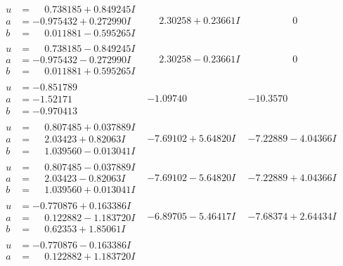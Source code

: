 \documentclass[1p]{elsarticle_modified}
\theoremstyle{definition}
\begin{document}
$$\begin{array}{c|c|c}
 \hline 
\begin{aligned}
u &= \phantom{-}0.738185 + 0.849245 I \\
a &= -0.975432 + 0.272990 I \\
b &= \phantom{-}0.011881 - 0.595265 I\end{aligned}
 & \phantom{-}2.30258 + 0.23661 I & \phantom{-0.000000 } 0 \\ \hline\begin{aligned}
u &= \phantom{-}0.738185 - 0.849245 I \\
a &= -0.975432 - 0.272990 I \\
b &= \phantom{-}0.011881 + 0.595265 I\end{aligned}
 & \phantom{-}2.30258 - 0.23661 I & \phantom{-0.000000 } 0 \\ \hline\begin{aligned}
u &= -0.851789\phantom{ +0.000000I} \\
a &= -1.52171\phantom{ +0.000000I} \\
b &= -0.970413\phantom{ +0.000000I}\end{aligned}
 & -1.09740\phantom{ +0.000000I} & -10.3570\phantom{ +0.000000I} \\ \hline\begin{aligned}
u &= \phantom{-}0.807485 + 0.037889 I \\
a &= \phantom{-}2.03423 + 0.82063 I \\
b &= \phantom{-}1.039560 - 0.013041 I\end{aligned}
 & -7.69102 + 5.64820 I & -7.22889 - 4.04366 I \\ \hline\begin{aligned}
u &= \phantom{-}0.807485 - 0.037889 I \\
a &= \phantom{-}2.03423 - 0.82063 I \\
b &= \phantom{-}1.039560 + 0.013041 I\end{aligned}
 & -7.69102 - 5.64820 I & -7.22889 + 4.04366 I \\ \hline\begin{aligned}
u &= -0.770876 + 0.163386 I \\
a &= \phantom{-}0.122882 - 1.183720 I \\
b &= \phantom{-}0.62353 + 1.85061 I\end{aligned}
 & -6.89705 - 5.46417 I & -7.68374 + 2.64434 I \\ \hline\begin{aligned}
u &= -0.770876 - 0.163386 I \\
a &= \phantom{-}0.122882 + 1.183720 I \\

\end{aligned}
\end{array}$$
\end{document}
